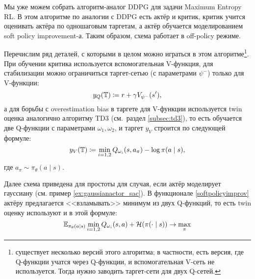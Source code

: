 Мы уже можем собрать алгоритм-аналог DDPG для задачи Maximum Entropy RL. В этом алгоритме по аналогии с DDPG есть актёр и критик, критик учится оценивать актёра по одношаговым таргетам, а актёр обучается моделированием soft policy improvement-а. Таким образом, схема работает в off-policy режиме.

Перечислим ряд деталей, с которыми в целом можно играться в этом алгоритме\footnote{существует несколько версий этого алгоритма; в частности, есть версия, где Q-функции учатся через Q-функции, и вспомогательная V-сеть не используется. Тогда нужно заводить таргет-сети для двух Q-сетей.}. При обучении критика используется вспомогательная V-функция, для стабилизации можно ограничиться таргет-сетью (с параметрами $\psi^{-}$) только для V-функции:
$$y_Q(\mathbb{T}) \coloneqq r + \gamma V_{\psi^{-}}(s'),$$
а для борьбы с overestimation bias в таргете для V-функции используется twin оценка аналогично алгоритму TD3 (см.~раздел \ref{subsec:td3}), то есть обучается две Q-функции с параметрами $\omega_1, \omega_2$, и таргет $y_V$ строится по следующей формуле: 
$$y_V(\mathbb{T}) \coloneqq \min_{i = {1, 2}} Q_{\omega_i}(s, a_\pi) - \log \pi(a \mid s),$$
где $a_\pi \sim \pi_\theta(a \mid s)$.

Далее схема приведена для простоты для случая, если актёр моделирует гауссиану (см. пример \ref{ex:gaussianactor_sac}). В функционале \eqref{softpolicyimprov} актёру предлагается <<взламывать>> минимум из двух Q-функций, то есть twin оценку используют и в этой формуле:
$$\mathbb{E}_{\pi_\theta(a \mid s)} \min_{i=1,2} Q_{\omega_i}(s, a) + \mathcal{H}(\pi(\cdot \mid s)) \to \max_{\pi}$$

